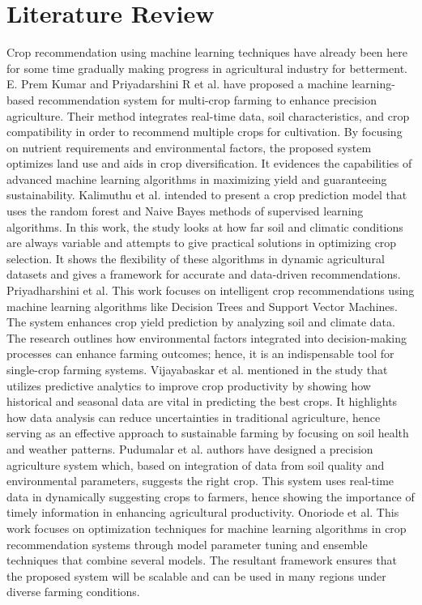 \documentclass[conference]{IEEEtran}
\begin{document}
\section{Literature Review}


Crop recommendation using machine learning techniques have already been here for some time gradually making progress in agricultural industry for betterment. E. Prem Kumar and Priyadarshini R et al. \cite{kumar2024enhanced}  have proposed a machine learning-based recommendation system for multi-crop farming to enhance precision agriculture. Their method integrates real-time data, soil characteristics, and crop compatibility in order to recommend multiple crops for cultivation. By focusing on nutrient requirements and environmental factors, the proposed system optimizes land use and aids in crop diversification. It evidences the capabilities of advanced machine learning algorithms in maximizing yield and guaranteeing sustainability. 
Kalimuthu et al.\cite{9214190} intended to present a crop prediction model that uses the random forest and Naive Bayes methods of supervised learning algorithms. In this work, the study looks at how far soil and climatic conditions are always variable and attempts to give practical solutions in optimizing crop selection. It shows the flexibility of these algorithms in dynamic agricultural datasets and gives a framework for accurate and data-driven recommendations. Priyadharshini et al. \cite{9418375} This work focuses on intelligent crop recommendations using machine learning algorithms like Decision Trees and Support Vector Machines. The system enhances crop yield prediction by analyzing soil and climate data. The research outlines how environmental factors integrated into decision-making processes can enhance farming outcomes; hence, it is an indispensable tool for single-crop farming systems. Vijayabaskar et al. \cite{8290395} mentioned in the study that utilizes predictive analytics to improve crop productivity by showing how historical and seasonal data are vital in predicting the best crops. It highlights how data analysis can reduce uncertainties in traditional agriculture, hence serving as an effective approach to sustainable farming by focusing on soil health and weather patterns. 
Pudumalar et al. \cite{7951740} authors have designed a precision agriculture system which, based on integration of data from soil quality and environmental parameters, suggests the right crop. This system uses real-time data in dynamically suggesting crops to farmers, hence showing the importance of timely information in enhancing agricultural productivity. Onoriode et al. \cite{13458882} This work focuses on optimization techniques for machine learning algorithms in crop recommendation systems through model parameter tuning and ensemble techniques that combine several models. The resultant framework ensures that the proposed system will be scalable and can be used in many regions under diverse farming conditions. 
\end{document}
